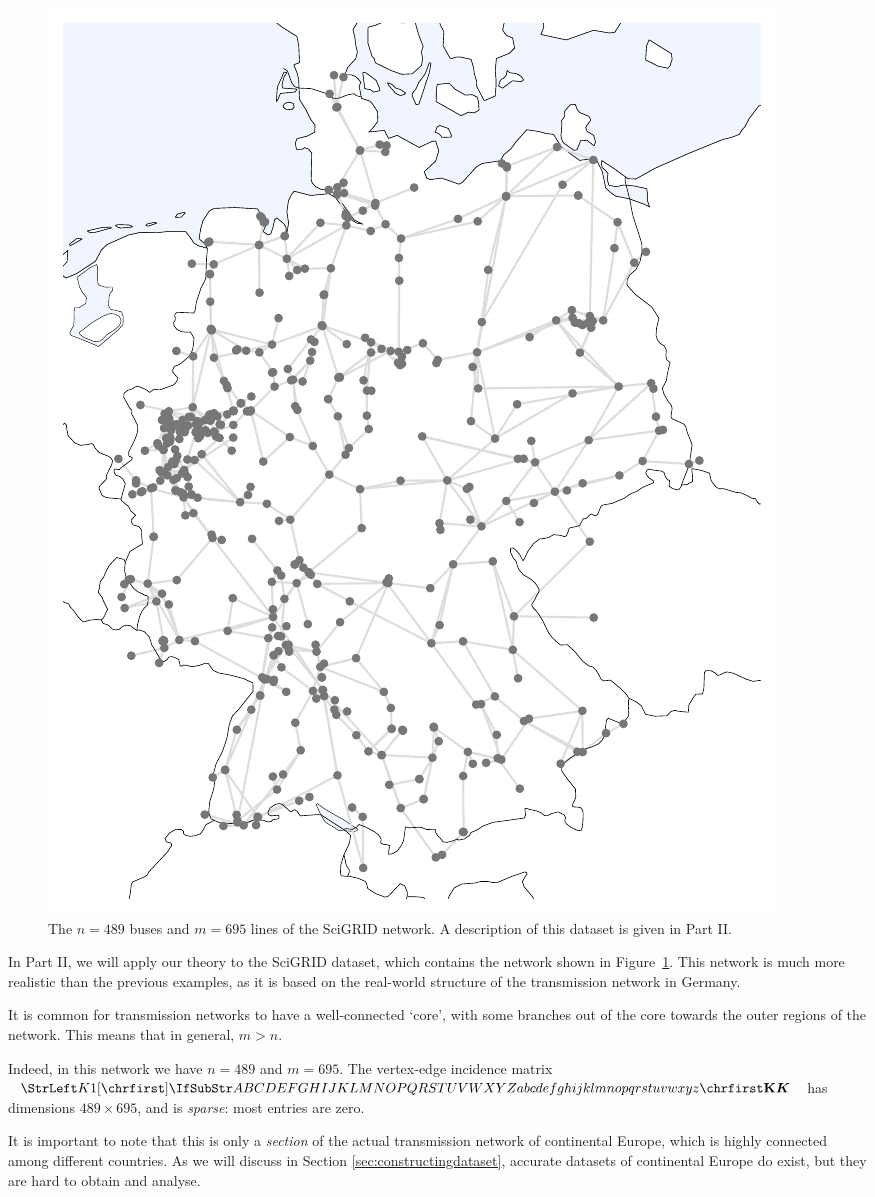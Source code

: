 \documentclass[main.tex]{subfiles}
\begin{document}
\begin{figure}
    \centering
    \includegraphics[width=.5\textwidth]{img/scigrid_boring.pdf}
    \caption{The $n=489$ buses and $m=695$ lines of the SciGRID network. A description of this dataset is given in Part II.}
    \label{fig:scigrid}
\end{figure}
\begin{example}\label{exa:scigridnetwork}
In Part II, we will apply our theory to the SciGRID dataset, which contains the network shown in Figure~\ref{fig:scigrid}. This network is much more realistic than the previous examples, as it is based on the real-world structure of the transmission network in Germany. 

It is common for transmission networks to have a well-connected `core', with some branches out of the core towards the outer regions of the network. This means that in general, $m>n$.

Indeed, in this network we have $n=489$ and $m=695$. The vertex-edge incidence matrix $\mat{K}$ has dimensions $489 \times 695$, and is \emph{sparse}: most entries are zero.

It is important to note that this is only a \emph{section} of the actual transmission network of continental Europe, which is highly connected among different countries. As we will discuss in Section \ref{sec:constructingdataset}, accurate datasets of continental Europe do exist, but they are hard to obtain and analyse.
\end{example}
\end{document}
